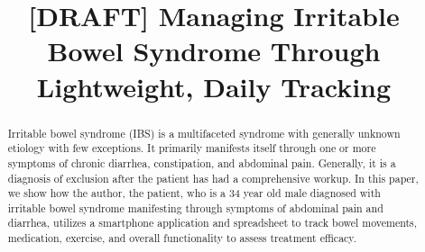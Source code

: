 \documentclass[conference]{IEEEtran}
\begin{document}
%
\title{[DRAFT] Managing Irritable Bowel Syndrome Through Lightweight, Daily Tracking}


\author{
}





\maketitle

\begin{abstract}
Irritable bowel syndrome (IBS) is a multifaceted syndrome with generally unknown etiology with few exceptions.  It primarily manifests itself through one or more symptoms of chronic diarrhea, constipation, and abdominal pain.  Generally, it is a diagnosis of exclusion after the patient has had a comprehensive workup. In this paper, we show how the author, the patient, who is a 34 year old male diagnosed with irritable bowel syndrome  manifesting through symptoms of abdominal pain and diarrhea, utilizes a smartphone application and spreadsheet to track bowel movements, medication, exercise, and overall functionality to assess treatment efficacy.
\end{abstract}




%
\IEEEpeerreviewmaketitle
\end{document}
